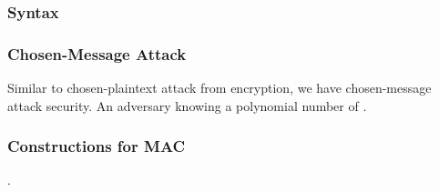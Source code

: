 
\subsubsection{Syntax}

\subsubsection{Chosen-Message Attack}
Similar to chosen-plaintext attack from encryption, we have chosen-message attack security. An adversary knowing a polynomial number of .

\subsubsection{Constructions for MAC}
.
